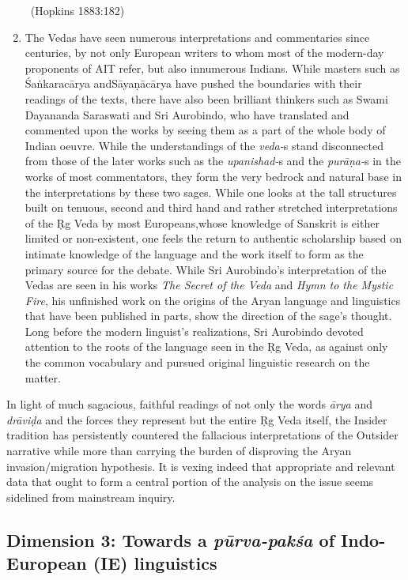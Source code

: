 \begin{enumerate}
\begin{myquote}
~\hfill (Hopkins 1883:182)
\end{myquote}


 \item The Vedas have seen numerous interpretations and commentaries since centuries, by not only European writers to whom most of the modern-day proponents of AIT refer, but also innumerous Indians. While masters such as Śaṅkaracārya and\break Sāyaṇācārya have pushed the boundaries with their readings of the texts, there have also been brilliant thinkers such as Swami Dayananda Saraswati and Sri Aurobindo, who have translated and commented upon the works by seeing them as a part of the whole body of Indian oeuvre. While the understandings of the \textit{veda-}s stand disconnected from those of the later works such as the \textit{upanishad-}s and the \textit{purāṇa-}s in the works of most commentators, they form the very bedrock and natural base in the interpretations by these two sages. While one looks at the tall structures built on tenuous, second and third hand and rather stretched interpretations of the Ṛg Veda by most Europeans,\break whose knowledge of Sanskrit is either limited or non-existent, one feels the return to authentic scholarship based on intimate knowledge of the language and the work itself to form as the primary source for the debate. While Sri Aurobindo’s interpretation of the Vedas are seen in his works \textit{The Secret of the Veda} and \textit{Hymn to the Mystic Fire}, his unfinished work on the origins of the Aryan language and linguistics that have been published in parts, show the direction of the sage’s thought. Long before the modern linguist’s realizations, Sri Aurobindo devoted attention to the roots of the language seen in the Ṛg Veda, as against only the common vocabulary and pursued original linguistic research on the matter.

\end{enumerate}

In light of much sagacious, faithful readings of not only the words \textit{ārya} and \textit{drāviḍa} and the forces they represent but the entire Ṛg Veda itself, the Insider tradition has persistently countered the fallacious interpretations of the Outsider narrative while more than carrying the burden of disproving the Aryan invasion/migration hypothesis. It is vexing indeed that appropriate and relevant data that ought to form a central portion of the analysis on the issue seems sidelined from mainstream inquiry.


\subsection{Dimension 3: Towards a \textit{pūrva-pakśa} of Indo-European (IE) linguistics}


